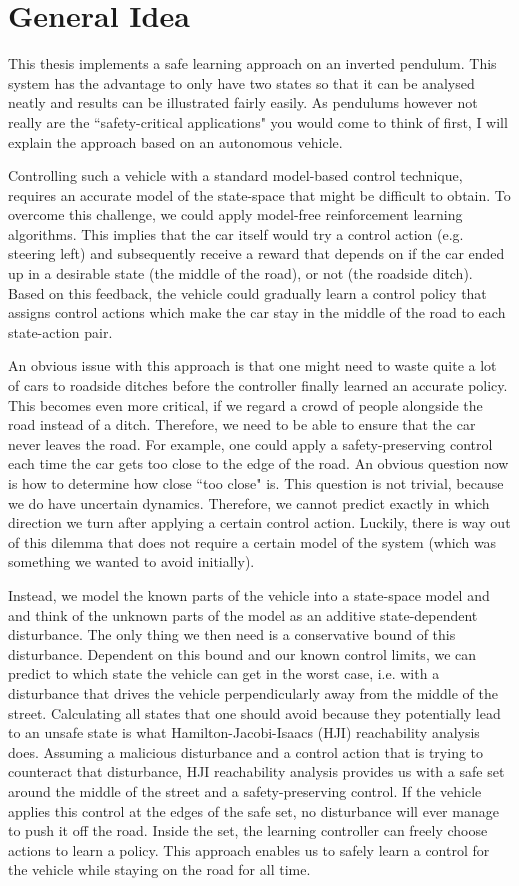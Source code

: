 \documentclass[../main.tex]{subfiles}
\begin{document}
\section{General Idea}
This thesis implements a safe learning approach on an inverted pendulum. This system has the advantage to only have two states so that it can be analysed neatly and results can be illustrated fairly easily. As pendulums however not really are the ``safety-critical applications" you would come to think of first, I will explain the approach based on an autonomous vehicle. \par
Controlling such a vehicle with a standard model-based control technique, requires an accurate model of the state-space that might be difficult to obtain. To overcome this challenge, we could apply model-free reinforcement learning algorithms. This implies that the car itself would try a control action (e.g. steering left) and subsequently receive a reward that depends on if the car ended up in a desirable state (the middle of the road), or not (the roadside ditch). Based on this feedback, the vehicle could gradually learn a control policy that assigns control actions which make the car stay in the middle of the road to each state-action pair. \par
An obvious issue with this approach is that one might need to waste quite a lot of cars to roadside ditches before the controller finally learned an accurate policy. This becomes even more critical, if we regard a crowd of people alongside the road instead of a ditch. Therefore, we need to be able to ensure that the car never leaves the road. For example, one could apply a safety-preserving control each time the car gets too close to the edge of the road. An obvious question now is how to determine how close ``too close" is. This question is not trivial, because we do have uncertain dynamics. Therefore, we cannot predict exactly in which direction we turn after applying a certain control action. Luckily, there is way out of this dilemma that does not require a certain model of the system (which was something we wanted to avoid initially).\par 
Instead, we model the known parts of the vehicle into a state-space model and and think of the unknown parts of the model as an additive state-dependent disturbance. The only thing we then need is a conservative bound of this disturbance. Dependent on this bound and our known control limits, we can predict to which state the vehicle can get in the worst case, i.e. with a disturbance that drives the vehicle perpendicularly away from the middle of the street. Calculating all states that one should avoid because they potentially lead to an unsafe state is what Hamilton-Jacobi-Isaacs (HJI) reachability analysis does. Assuming a malicious disturbance and a control action that is trying to counteract that disturbance, HJI reachability analysis provides us with a safe set around the middle of the street and a safety-preserving control. If the vehicle applies this control at the edges of the safe set, no disturbance will ever manage to push it off the road. Inside the set, the learning controller can freely choose actions to learn a policy. This approach enables us to safely learn a control for the vehicle while staying on the road for all time. \par 
\end{document}
